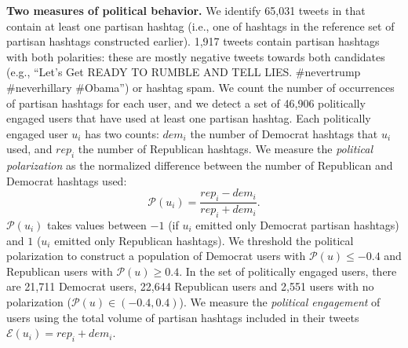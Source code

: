 
\textbf{Two measures of political behavior.}
We identify 65,031 tweets in \debate that contain at least one partisan hashtag (i.e., one of hashtags in the reference set of partisan hashtags constructed earlier).
1,917 tweets contain partisan hashtags with both polarities: these are mostly negative tweets towards both candidates (e.g., ``Let's Get READY TO RUMBLE AND TELL LIES. \#nevertrump \#neverhillary \#Obama'') or hashtag spam.
We count the number of occurrences of partisan hashtags for each user, and we detect a set of 46,906 politically engaged users that have used at least one partisan hashtag.
Each politically engaged user $u_i$ has two counts: $dem_i$ the number of Democrat hashtags that $u_i$ used, and $rep_i$ the number of Republican hashtags.
We measure the \emph{political polarization} as the normalized difference between the number of Republican and Democrat hashtags used:
\begin{equation}
	\mathcal{P}(u_i) = \frac{rep_i - dem_i}{rep_i + dem_i}.
\end{equation}
$\mathcal{P}(u_i)$ takes values between $-1$ (if $u_i$ emitted only Democrat partisan hashtags) and $1$ ($u_i$ emitted only Republican hashtags).
We threshold the political polarization to construct a population of Democrat users with $\mathcal{P}(u) \leq -0.4$ and Republican users with $\mathcal{P}(u) \geq 0.4$.
In the set of politically engaged users, there are 21,711 Democrat users, 22,644 Republican users and 2,551 users with no polarization ($\mathcal{P}(u) \in (-0.4, 0.4)$).
%
We measure the \emph{political engagement} of users using the total volume of partisan hashtags included in their tweets $\mathcal{E}(u_i) = rep_i + dem_i$.

